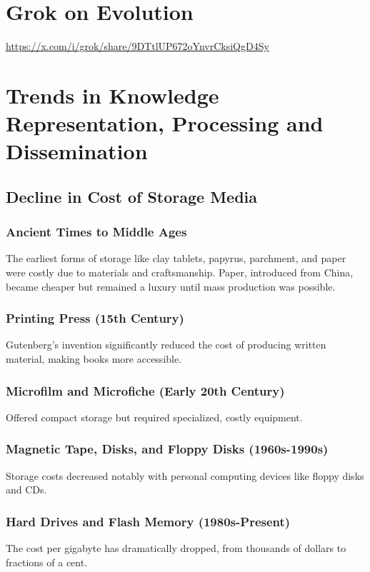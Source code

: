 \documentclass[10pt,titlepage]{book}
\begin{document}
\chapter{Grok on Evolution}

\url{https://x.com/i/grok/share/9DTtlUP672oYnvrCksiQgD4Sy}

\chapter{Trends in Knowledge Representation, Processing and Dissemination}

\section{Decline in Cost of Storage Media}

\subsection{Ancient Times to Middle Ages}
The earliest forms of storage like clay tablets, papyrus, parchment, and paper were costly due to materials and craftsmanship. Paper, introduced from China, became cheaper but remained a luxury until mass production was possible.

\subsection{Printing Press (15th Century)}
Gutenberg's invention significantly reduced the cost of producing written material, making books more accessible.

\subsection{Microfilm and Microfiche (Early 20th Century)}
Offered compact storage but required specialized, costly equipment.

\subsection{Magnetic Tape, Disks, and Floppy Disks (1960s-1990s)}
Storage costs decreased notably with personal computing devices like floppy disks and CDs.

\subsection{Hard Drives and Flash Memory (1980s-Present)}
The cost per gigabyte has dramatically dropped, from thousands of dollars to fractions of a cent.
\end{document}
